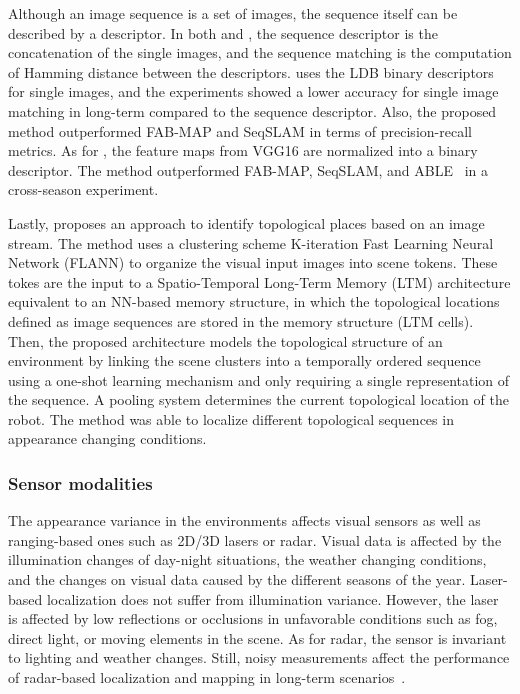Although an image sequence is a set of images, the sequence itself can be described by a descriptor. In both \cite{arroyo-et-al:2018:7} and \cite{zhu-et-al:2018:8500686}, the sequence descriptor is the concatenation of the single images, and the sequence matching is the computation of Hamming distance between the descriptors. \cite{arroyo-et-al:2018:7} uses the LDB binary descriptors for single images, and the experiments showed a lower accuracy for single image matching in long-term compared to the sequence descriptor. Also, the proposed method outperformed FAB-MAP and SeqSLAM in terms of precision-recall metrics.
As for \cite{zhu-et-al:2018:8500686}, the feature maps from VGG16 are normalized into a binary descriptor. The method outperformed FAB-MAP, SeqSLAM, and ABLE~\parencite{arroyo-et-al:2018:7} in a cross-season experiment.

Lastly, \cite{nguyen-et-al:2013:004} proposes an approach to identify topological places based on an image stream. 
The method uses a clustering scheme K-iteration Fast Learning Neural Network (FLANN) to organize the visual input images into scene tokens. These tokes are the input to a Spatio-Temporal Long-Term Memory (LTM) architecture equivalent to an NN-based memory structure, in which the topological locations defined as image sequences are stored in the memory structure (LTM cells). Then, the proposed architecture models the topological structure of an environment by linking the scene clusters into a temporally ordered sequence using a one-shot learning mechanism and only requiring a single representation of the sequence.
A pooling system determines the current topological location of the robot.
The method was able to localize different topological sequences in appearance changing conditions.



\subsubsection{Sensor modalities}

The appearance variance in the environments affects visual sensors as well as ranging-based ones such as 2D/3D lasers or radar. Visual data is affected by the illumination changes of day-night situations, the weather changing conditions, and the changes on visual data caused by the different seasons of the year. Laser-based localization does not suffer from illumination variance. However, the laser is affected by low reflections or occlusions  in unfavorable conditions such as fog, direct light, or moving elements in the scene. As for radar, the sensor is invariant to lighting and weather changes. Still, noisy measurements affect the performance of radar-based localization and mapping in long-term scenarios~\parencite{yin-et-al:2021:661199}.

